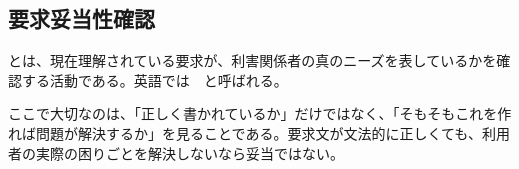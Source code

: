 \subsection{要求妥当性確認}

とは、現在理解されている要求が、利害関係者の真のニーズを表しているかを確認する活動である。英語では \,\, と呼ばれる。

ここで大切なのは、「正しく書かれているか」だけではなく、「そもそもこれを作れば問題が解決するか」を見ることである。要求文が文法的に正しくても、利用者の実際の困りごとを解決しないなら妥当ではない。

